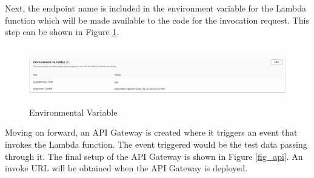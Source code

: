 Next, the endpoint name is included in the environment variable for the Lambda function which will be made available to the code for the invocation request. This step can be shown in Figure \ref{fig_env}. 

\begin{figure} [ht]
    \centering
    \includegraphics[width=14.0cm,height=2.5cm,scale =0.45]{pages/Chapter4/Chapter 4 Images/ENVIRON.PNG}
    \caption{Environmental Variable}
    \label{fig_env}
\end{figure}

Moving on forward, an API Gateway is created where it triggers an event that invokes the Lambda function. The event triggered would be the test data passing through it. The final setup of the API Gateway is shown in Figure \ref{fig_api}. An invoke URL will be obtained when the API Gateway is deployed. 


